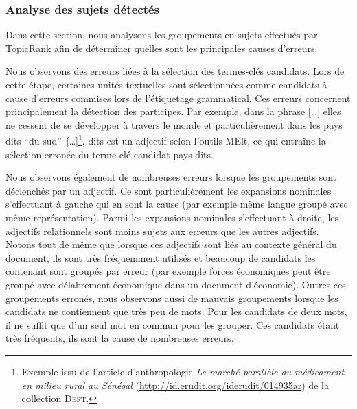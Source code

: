         \subsubsection{Analyse des sujets détectés}
        \label{subsubsec:main:domain_independent_keyphrase_extraction-unsupervised_automatic_keyphrase_extraction-error_analysis-detected_topics}
          Dans cette section, nous analysons les groupements en sujets effectués
          par Topic\-Rank afin de déterminer quelles sont les principales causes
          d'erreurs.


          Nous observons des erreurs liées à la sélection des termes-clés
          candidats. Lors de cette étape, certaines unités textuelles sont
          sélectionnées comme candidats à cause d'erreurs commises lors de
          l'étiquetage grammatical. Ces erreurs concernent principalement la
          détection des participes. Par exemple, dans la phrase \og{}[\dots]
          elles ne cessent de se développer à travers le monde et
          particulièrement dans les pays dits ``du
          sud''~[\dots]\fg{}\footnote{Exemple issu de l'article d'anthropologie
          \textit{Le marché parallèle du médicament en milieu rural au Sénégal}
          (\url{http://id.erudit.org/iderudit/014935ar}) de la collection
          \textsc{Deft}.}, \og{}dits\fg{} est un adjectif selon l'outils MElt, ce qui
          entraîne la sélection erronée du terme-clé candidat \og{}pays
          dits\fg{}.

          Nous observons également de nombreuses erreurs lorsque les groupements
          sont déclenchés par un adjectif. Ce sont particulièrement les
          expansions nominales s'effectuant à gauche qui en sont la cause (par
          exemple \og{}même langue\fg{} groupé avec \og{}même
          représentation\fg{}). Parmi les expansions nominales s'effectuant à
          droite, les adjectifs relationnels sont moins sujets aux erreurs que
          les autres adjectifs. Notons tout de même que lorsque ces adjectifs
          sont liés au contexte général du document, ils sont très fréquemment
          utilisés et beaucoup de candidats les contenant sont groupés par
          erreur (par exemple \og{}forces économiques\fg{} peut être groupé
          avec \og{}délabrement économique\fg{} dans un document d'économie).
          Outres ces groupements erronés, nous observons aussi de mauvais
          groupements lorsque les candidats ne contiennent que très peu de mots.
          Pour les candidats de deux mots, il ne suffit que d'un seul mot en
          commun pour les grouper. Ces candidats étant très fréquents, ils sont
          la cause de nombreuses erreurs.

